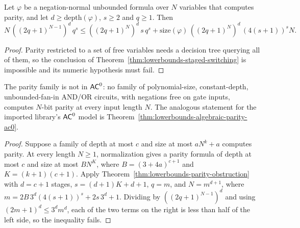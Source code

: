 \begin{theorem}
  \label{thm:lowerbounds-parity-obstruction}
  \leanok
  Let $\varphi$ be a negation-normal unbounded formula over $N$ variables
  that computes parity, and let $d \ge \mathrm{depth}(\varphi)$, $s \ge 2$ and
  $q \ge 1$. Then
  \[ N\, ((2q+1)^{N-1})^d\, q^s \le ((2q+1)^N)^d\, s\, q^s
     + \mathrm{size}(\varphi)\,((2q+1)^N)^d\,(4(s+1))^s N . \]
\end{theorem}
\begin{proof}
  \leanok
  Parity restricted to a set of free variables needs a decision tree querying
  all of them, so the conclusion of Theorem~\ref{thm:lowerbounds-staged-switching}
  is impossible and its numeric hypothesis must fail.
\end{proof}

\begin{theorem}
  \label{thm:lowerbounds-parity-not-ac0}
  \leanok
  The parity family is not in $\mathsf{AC}^0$: no family of polynomial-size,
  constant-depth, unbounded-fan-in AND/OR circuits, with negations free on gate
  inputs, computes $N$-bit parity at every input length $N$. The analogous
  statement for the imported library's $\mathsf{AC}^0$ model is
  Theorem~\ref{thm:lowerbounds-algebraic-parity-ac0}.
\end{theorem}
\begin{proof}
  \leanok
  Suppose a family of depth at most $c$ and size at most $a N^k + a$ computes
  parity. At every length $N \ge 1$, normalization gives a parity formula of
  depth at most $c$ and size at most $B N^K$, where $B = (3 + 4a)^{c+1}$ and
  $K = (k + 1)(c + 1)$. Apply Theorem~\ref{thm:lowerbounds-parity-obstruction}
  with $d = c + 1$ stages, $s = (d + 1)K + d + 1$, $q = m$, and $N = m^{d+1}$,
  where $m = 2B\,3^d(4(s+1))^s + 2s\,3^d + 1$. Dividing by
  $((2q+1)^{N-1})^d$ and using $(2m+1)^d \le 3^d m^d$, each of the two terms
  on the right is less than half of the left side, so the inequality fails.
\end{proof}

